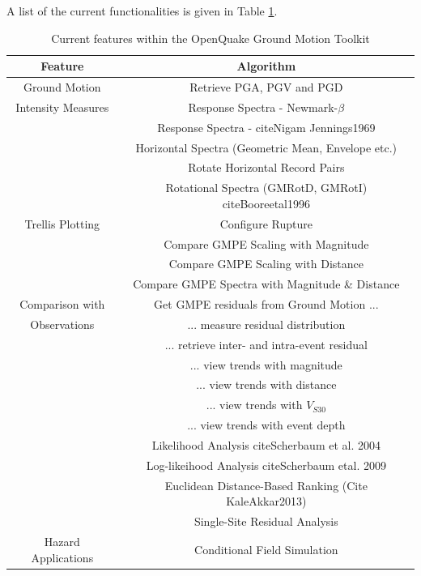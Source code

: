 A list of the current functionalities is given in Table \ref{tab:features}.

\begin{table}
\centering
\begin{tabular}{|c|c|} \hline
\textbf{Feature} & \textbf{Algorithm} \\ \hline
Ground Motion  &  Retrieve PGA, PGV and PGD \\
Intensity Measures  &  Response Spectra - Newmark-$\beta$ \\
  &   Response Spectra - citeNigam Jennings1969 \\
  &   Horizontal Spectra (Geometric Mean, Envelope etc.) \\
  &   Rotate Horizontal Record Pairs \\
  &   Rotational Spectra (GMRotD, GMRotI) citeBooreetal1996 \\ \hline
Trellis Plotting & Configure Rupture \\
                 & Compare GMPE Scaling with Magnitude \\
                 & Compare GMPE Scaling with Distance \\
                 & Compare GMPE Spectra with Magnitude \& Distance \\ \hline
Comparison with  & Get GMPE residuals from Ground Motion ... \\
Observations     & ... measure residual distribution \\
                 & ... retrieve inter- and intra-event residual \\
                 & ... view trends with magnitude \\
                 & ... view trends with distance \\
                 & ... view trends with $V_{S30}$ \\
                 & ... view trends with event depth \\
                 & Likelihood Analysis citeScherbaum et al. 2004\\
                 & Log-likeihood Analysis citeScherbaum etal. 2009\\
                 & Euclidean Distance-Based Ranking (Cite KaleAkkar2013) \\
                 & Single-Site Residual Analysis \\ \hline
Hazard Applications & Conditional Field Simulation \\ \hline
\end{tabular}
\caption{Current features within the OpenQuake Ground Motion Toolkit}
\label{tab:features}

\end{table}

